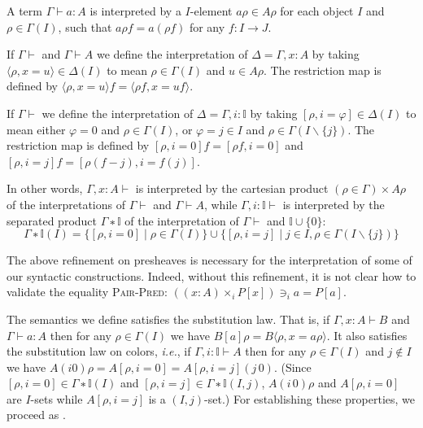 \documentclass[english]{PaperTools/latex/lipics}
\newcommand\CTimes[2]{(#2) ×_{#1}}
\newcommand\op[1]{∋_{#1}}
\def\ie{\textit{i.e.}}
\begin{document}
\medskip
A term $Γ ⊢ a : A$ is interpreted by a $I$-element $aρ ∈ Aρ$ for each
object $I$ and $ρ ∈ Γ(I)$, such that $aρf = a(ρf)$ for any $f : I → J$.

\medskip
If $Γ⊢$ and $Γ ⊢ A$ we define the interpretation of $Δ = Γ,x:A$
by taking $⟨ρ,x=u⟩ ∈ Δ(I)$ to mean $ρ ∈ Γ(I)$ and $u ∈ Aρ$.
The restriction map is defined by $⟨ρ,x=u⟩f = ⟨ρf, x=uf⟩$.

\smallskip
If $Γ⊢$ we define the interpretation of $Δ = Γ,i:𝕀$ by taking
$[ρ,i=φ] ∈ Δ(I)$ to mean either $φ = 0$ and $ρ ∈ Γ(I)$, or
$φ = j ∈ I$ and $ρ ∈ Γ(I\backslash\{j\})$.
The restriction map is defined by
$[ρ,i=0]f = [ρf,i=0]$ and $[ρ,i=j]f = [ρ(f-j),i=f(j)]$.
\begin{remark}
  In other words,
  $Γ,x:A⊢$ is interpreted by the cartesian product $(ρ∈Γ) × Aρ$ of the
  interpretations of $Γ⊢$ and $Γ⊢A$, while
  $Γ,i:𝕀⊢$ is interpreted by the separated product \cite[sec.~3.4
  p.~54]{PittsAM:nomsns} $Γ ∗ 𝕀$ of the
  interpretation of $Γ⊢$ and $𝕀 ∪ \{0\}$:
  $$Γ ∗ 𝕀(I) = \{ [ρ,i=0] \mid ρ ∈ Γ(I) \} ∪
               \{ [ρ,i=j] \mid j ∈ I, ρ ∈ Γ(I\backslash\{j\}) \}$$
\end{remark}


\bigskip
The above refinement on presheaves is necessary for the interpretation
of some of our syntactic constructions.  Indeed, without this refinement,
it is not clear how to validate the equality \textsc{Pair-Pred}:
${{(\CTimes i {x:A} P[x])} \op i a = P[a]}$.

\bigskip
The semantics we define satisfies the substitution law. That is, if $Γ,x:A ⊢ B$
and $Γ ⊢ a:A$ then for any $ρ ∈ Γ(I)$ we have
$B[a]ρ = B⟨ρ,x=aρ⟩$.
It also satisfies the substitution law on colors, \ie, if $Γ,i:𝕀 ⊢ A$
then for any $ρ ∈ Γ(I)$ and $j ∉ I$ we have
$A(i 0)ρ = A[ρ,i=0] = A[ρ,i=j](j\, 0)$.
(Since $[ρ,i=0] ∈ Γ∗𝕀(I)$ and $[ρ,i=j] ∈ Γ∗𝕀(I,j)$, $A(i\, 0)ρ$ and
$A[ρ,i=0]$ are $I$-sets while $A[ρ,i=j]$ is a $(I,j)$-set.)
For establishing these properties, we proceed as \citet{Aczel98onrelating}.
\end{document}
